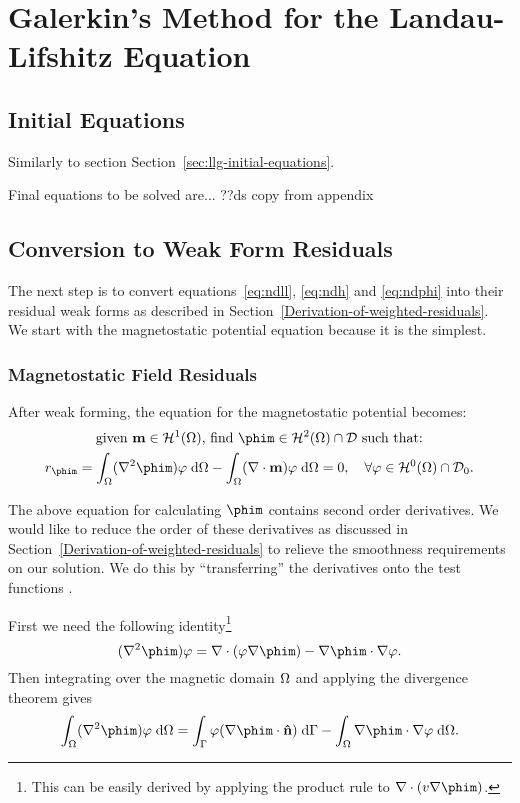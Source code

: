 
\chapter{Galerkin's Method for the Landau-Lifshitz Equation}
\label{sec:galerk-meth-ll}

\section{Initial Equations}
Similarly to section Section~\ref{sec:llg-initial-equations}.

Final equations to be solved are... ??ds copy from appendix

\section{Conversion to Weak Form Residuals}

The next step is to convert equations~\eqref{eq:ndll}, \eqref{eq:ndh} and \eqref{eq:ndphi} into their residual weak forms as described in Section~\ref{Derivation-of-weighted-residuals}.
We start with the magnetostatic potential equation because it is the simplest.

\subsection{Magnetostatic Field Residuals}
\label{sec:magn-field-resid}

After weak forming, the equation for the magnetostatic potential becomes:
\begin{gather}
  \text{given $\mv \in \sob^1(\magd)$, find $\phim \in \sob^2(\magd) \cap \Dfs$ such that:} \notag \\
  r_{\phim} = \intd{(\lap \phim) \tbf}
  - \intd{(\nabla \cdot \mv) \tbf} = 0,
  \quad \forall \tbf \in \sob^0(\magd) \cap \Dfs_0. \label{eqn:phires1}
\end{gather}

The above equation for calculating $\phim$ contains second order derivatives.
We would like to reduce the order of these derivatives as discussed in Section~\ref{Derivation-of-weighted-residuals} to relieve the smoothness requirements on our solution.
We do this by ``transferring'' the derivatives onto the test functions \cite{HowardElmanDavidSilvester2006}.

First we need the following identity\footnote{This can be easily derived by applying the product rule to $\nabla \cdot (v \nabla \phim)$.}
\begin{equation}
  (\lap \phim) \tbf =
  \nabla \cdot (\tbf \nabla \phim)
  - \nabla \phim \cdot \nabla \tbf.
  \label{eq:20}
\end{equation}
Then integrating over the magnetic domain $\Omega$ and applying the divergence theorem gives
\begin{equation}
  \intd{(\lap \phim) \tbf} =
  \int_{\boundd} \tbf (\nabla \phim \cdot \nv) \d \boundd
  - \intd{\nabla \phim \cdot \nabla \tbf}.
  \label{eqn:identitygauss}
\end{equation}

